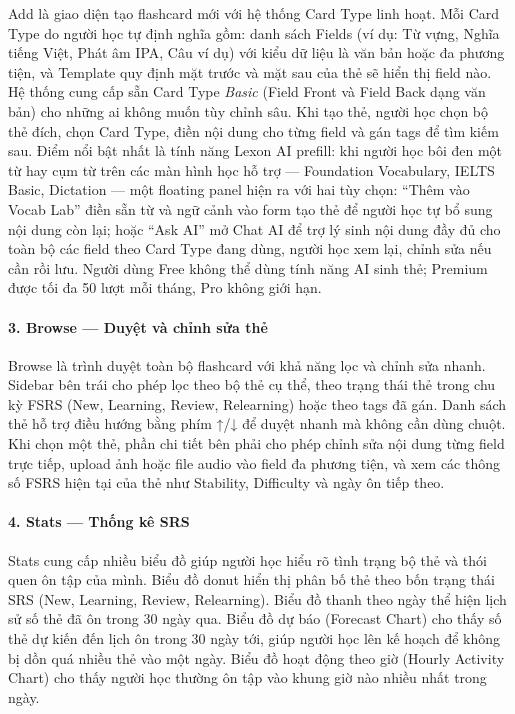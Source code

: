 Add là giao diện tạo flashcard mới với hệ thống Card Type linh hoạt. Mỗi Card Type do người học tự định nghĩa gồm: danh sách Fields (ví dụ: Từ vựng, Nghĩa tiếng Việt, Phát âm IPA, Câu ví dụ) với kiểu dữ liệu là văn bản hoặc đa phương tiện, và Template quy định mặt trước và mặt sau của thẻ sẽ hiển thị field nào. Hệ thống cung cấp sẵn Card Type \textit{Basic} (Field Front và Field Back dạng văn bản) cho những ai không muốn tùy chỉnh sâu. Khi tạo thẻ, người học chọn bộ thẻ đích, chọn Card Type, điền nội dung cho từng field và gán tags để tìm kiếm sau. Điểm nổi bật nhất là tính năng Lexon AI prefill: khi người học bôi đen một từ hay cụm từ trên các màn hình học hỗ trợ --- Foundation Vocabulary, IELTS Basic, Dictation --- một floating panel hiện ra với hai tùy chọn: ``Thêm vào Vocab Lab'' điền sẵn từ và ngữ cảnh vào form tạo thẻ để người học tự bổ sung nội dung còn lại; hoặc ``Ask AI'' mở Chat AI để trợ lý sinh nội dung đầy đủ cho toàn bộ các field theo Card Type đang dùng, người học xem lại, chỉnh sửa nếu cần rồi lưu. Người dùng Free không thể dùng tính năng AI sinh thẻ; Premium được tối đa 50 lượt mỗi tháng, Pro không giới hạn.

\paragraph{3. Browse --- Duyệt và chỉnh sửa thẻ}

Browse là trình duyệt toàn bộ flashcard với khả năng lọc và chỉnh sửa nhanh. Sidebar bên trái cho phép lọc theo bộ thẻ cụ thể, theo trạng thái thẻ trong chu kỳ FSRS (New, Learning, Review, Relearning) hoặc theo tags đã gán. Danh sách thẻ hỗ trợ điều hướng bằng phím ↑/↓ để duyệt nhanh mà không cần dùng chuột. Khi chọn một thẻ, phần chi tiết bên phải cho phép chỉnh sửa nội dung từng field trực tiếp, upload ảnh hoặc file audio vào field đa phương tiện, và xem các thông số FSRS hiện tại của thẻ như Stability, Difficulty và ngày ôn tiếp theo.

\paragraph{4. Stats --- Thống kê SRS}

Stats cung cấp nhiều biểu đồ giúp người học hiểu rõ tình trạng bộ thẻ và thói quen ôn tập của mình. Biểu đồ donut hiển thị phân bố thẻ theo bốn trạng thái SRS (New, Learning, Review, Relearning). Biểu đồ thanh theo ngày thể hiện lịch sử số thẻ đã ôn trong 30 ngày qua. Biểu đồ dự báo (Forecast Chart) cho thấy số thẻ dự kiến đến lịch ôn trong 30 ngày tới, giúp người học lên kế hoạch để không bị dồn quá nhiều thẻ vào một ngày. Biểu đồ hoạt động theo giờ (Hourly Activity Chart) cho thấy người học thường ôn tập vào khung giờ nào nhiều nhất trong ngày.

